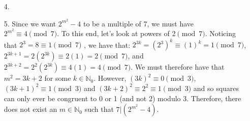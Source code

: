 \documentclass[a4paper,12pt]{article}
\begin{document}
\begin{enumerate}
    \item[4.] 
    

    \item[5.] Since we want $2^{m^2}-4$ to be a multiple of 7, we must have $2^{m^2} \equiv 4 \pmod{7}$. To this end, let's look at powers of 2$\pmod{7}$. Noticing that $2^3=8\equiv 1 \pmod{7}$ , we have that: $2^{3k} = (2^3)^k \equiv (1)^k = 1 \pmod{7}$, $2^{3k+1} = 2(2^{3k}) \equiv 2(1) = 2 \pmod{7}$, and $2^{3k+2} = 2^2(2^{3k}) \equiv 4(1) = 4 \pmod{7}$. We must therefore have that $m^2 = 3k+2$ for some $k\in \mathbb{N}_0$. However, $(3k)^2\equiv 0 \pmod{3}$, $(3k+1)^2\equiv 1 \pmod{3}$ and $(3k+2)^2 \equiv 2^2 \equiv 1 \pmod{3}$ and so squares can only ever be congruent to 0 or 1 (and not 2) modulo 3. Therefore, there does not exist an $m\in \mathbb{N}_0$ such that $7|(2^{m^2}-4)$.
    
    
\end{enumerate}
\end{document}
